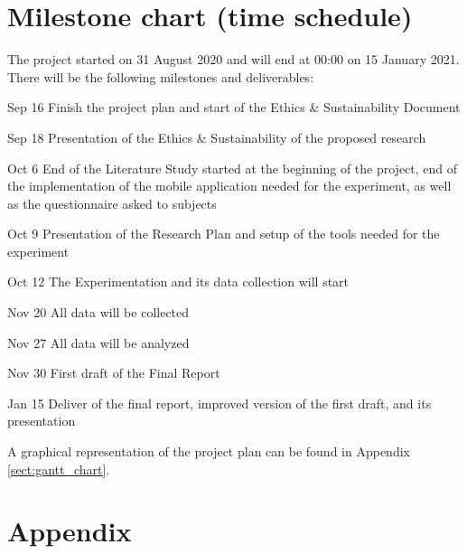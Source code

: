 \documentclass[12pt,twoside,english]{article}
\begin{document}
\section{Milestone chart (time schedule)}
\label{sect:milestones}

The project started on 31 August 2020 and will end at 00:00 on 15 January 2021. There will be the following milestones and deliverables:

\begin{description}
\item{Sep 16} Finish the project plan and start of the Ethics \& Sustainability Document

\item {Sep 18} Presentation of the Ethics \& Sustainability of the proposed research

\item {Oct 6} End of the Literature Study started at the beginning of the project, end of the implementation of the mobile application needed for the experiment, as well as the questionnaire asked to subjects

\item {Oct 9} Presentation of the Research Plan and setup of the tools needed for the experiment

\item {Oct 12} The Experimentation and its data collection will start

\item {Nov 20} All data will be collected

\item {Nov 27} All data will be analyzed

\item {Nov 30} First draft of the Final Report

\item {Jan 15} Deliver of the final report, improved version of the first draft, and its presentation

\end{description}

A graphical representation of the project plan can be found in Appendix \ref{sect:gantt_chart}.


% 


\appendix
\section{Appendix}
\label{sect:appendix}
\end{document}
